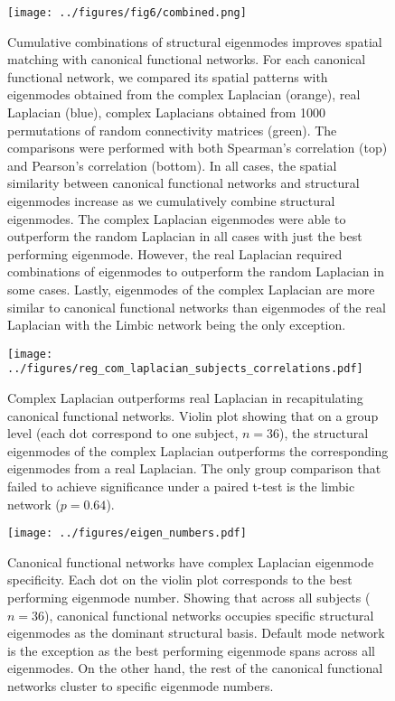 \documentclass{article}
\begin{document}
\begin{figure}[ht]
\centering
\texttt{[image: ../figures/fig6/combined.png]}
\caption{Cumulative combinations of structural eigenmodes improves spatial matching with canonical functional networks. For each canonical functional network, we compared its spatial patterns with eigenmodes obtained from the complex Laplacian (orange), real Laplacian (blue), complex Laplacians obtained from 1000 permutations of random connectivity matrices (green). The comparisons were performed with both Spearman's correlation (top) and Pearson's correlation (bottom). In all cases, the spatial similarity between canonical functional networks and structural eigenmodes increase as we cumulatively combine structural eigenmodes. The complex Laplacian eigenmodes were able to outperform the random Laplacian in all cases with just the best performing eigenmode. However, the real Laplacian required combinations of eigenmodes to outperform the random Laplacian in some cases. Lastly, eigenmodes of the complex Laplacian are more similar to canonical functional networks than eigenmodes of the real Laplacian with the Limbic network being the only exception.}
\label{fig:fig5}
\end{figure}

\begin{figure}[ht]
\centering
\texttt{[image: ../figures/reg\_com\_laplacian\_subjects\_correlations.pdf]}
\caption{Complex Laplacian outperforms real Laplacian in recapitulating canonical functional networks. Violin plot showing that on a group level (each dot correspond to one subject, $n = 36$), the structural eigenmodes of the complex Laplacian outperforms the corresponding eigenmodes from a real Laplacian. The only group comparison that failed to achieve significance under a paired t-test is the limbic network ($p = 0.64$).}
\label{fig:fig6}
\end{figure}


\begin{figure}[ht]
\texttt{[image: ../figures/eigen\_numbers.pdf]}
\caption{Canonical functional networks have complex Laplacian eigenmode specificity. Each dot on the violin plot corresponds to the best performing eigenmode number. Showing that across all subjects ($n = 36$), canonical functional networks occupies specific structural eigenmodes as the dominant structural basis. Default mode network is the exception as the best performing eigenmode spans across all eigenmodes. On the other hand, the rest of the canonical functional networks cluster to specific eigenmode numbers.}
\label{fig:fig7}
\end{figure}
\end{document}

